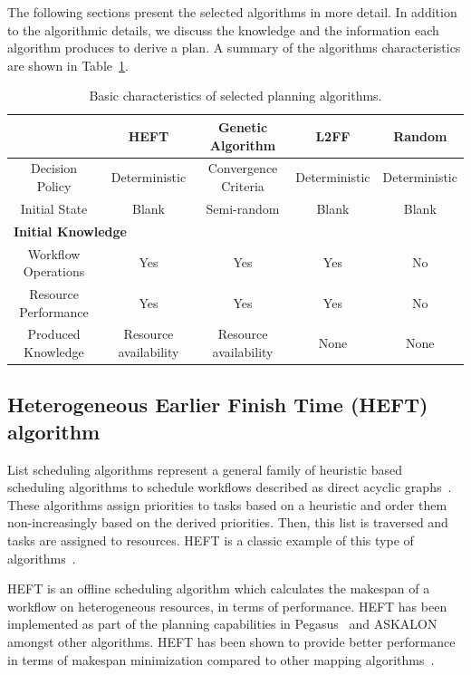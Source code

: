 The following sections present the selected algorithms in more detail.
In addition to the algorithmic details, we discuss the knowledge and the information each algorithm produces to derive a plan.
A summary of the algorithms characteristics are shown in Table~\ref{tab:sched_algo}.

\begin{table}[t]
    \centering
    \scriptsize
    \begin{tabular}{@{}ccccc@{}}
        \toprule
        &\textbf{HEFT}     &\textbf{Genetic Algorithm} &\textbf{L2FF} & \textbf{Random} \\
        \midrule
        Decision Policy   &Deterministic &Convergence Criteria &Deterministic& Deterministic\\
        Initial State    &Blank &Semi-random &Blank & Blank\\
        \midrule
        \multicolumn{5}{l}{\textbf{Initial Knowledge}}\\\midrule
        Workflow Operations &Yes & Yes & Yes & No\\
        Resource Performance &Yes &Yes &Yes & No\\
        \midrule
        Produced Knowledge& Resource availability& Resource availability&None&None\\
        \bottomrule
    \end{tabular}
    \caption{Basic characteristics of selected planning algorithms.\label{tab:sched_algo}}
\end{table}

\subsection{Heterogeneous Earlier Finish Time (HEFT) algorithm}
\label{algo:heft}
List scheduling algorithms represent a general family of heuristic based scheduling algorithms to schedule workflows described as direct acyclic graphs~\cite{dong2006scheduling,list_sched_wiki}. 
These algorithms assign priorities to tasks based on a heuristic and order them non-increasingly based on the derived priorities.
Then, this list is traversed and tasks are assigned to resources.
HEFT is a classic example of this type of algorithms~\cite{dong2006scheduling}.

HEFT is an offline scheduling algorithm which calculates the makespan of a workflow on heterogeneous resources, in terms of performance.
HEFT has been implemented as part of the planning capabilities in Pegasus~\cite{deelman2015pegasus} and ASKALON~\cite{fahringer2005askalon} amongst other algorithms.
HEFT has been shown to provide better performance in terms of makespan minimization compared to other mapping algorithms~\cite{topcuoglu2002performance,fahringer2005askalon,canon2008comparative}. 

